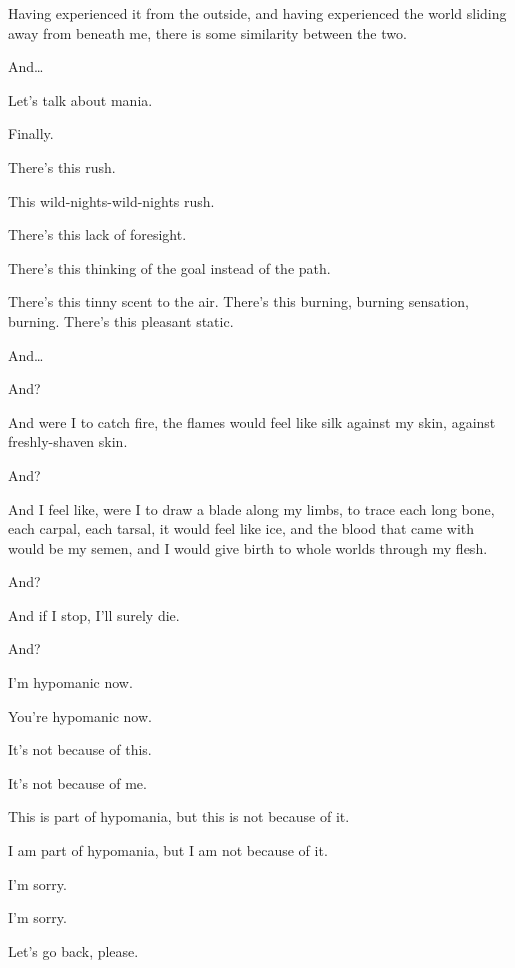 Having experienced it from the outside, and having experienced the world sliding away from beneath me, there is some similarity between the two.

And\ldots{}

\newpage


Let's talk about mania.

\begin{ally}
Finally.
\end{ally}
There's this rush.

This wild-nights-wild-nights rush.

There's this lack of foresight.

There's this thinking of the goal instead of the path.

There's this tinny scent to the air. There's this burning, burning sensation, burning. There's this pleasant static.

And\ldots{}

\newpage


\begin{ally}
And?
\end{ally}
And were I to catch fire, the flames would feel like silk against my skin, against freshly-shaven skin.

\begin{ally}
And?
\end{ally}
And I feel like, were I to draw a blade along my limbs, to trace each long bone, each carpal, each tarsal, it would feel like ice, and the blood that came with would be my semen, and I would give birth to whole worlds through my flesh.

\begin{ally}
And?
\end{ally}
And if I stop, I'll surely die.

\begin{ally}
And?
\end{ally}
\newpage


I'm hypomanic now.

\begin{ally}
You're hypomanic now.
\end{ally}
It's not because of this.

\begin{ally}
It's not because of me.
\end{ally}
This is part of hypomania, but this is not because of it.

\begin{ally}
I am part of hypomania, but I am not because of it.
\end{ally}
I'm sorry.

\begin{ally}
I'm sorry.
\end{ally}
Let's go back, please.
\newpage
